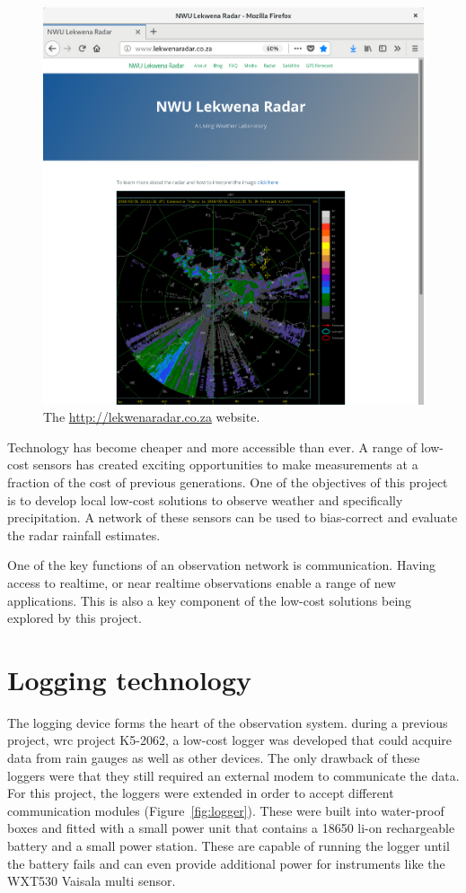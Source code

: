 \documentclass{wrcreport}
\begin{document}
\begin{figure}[!htp]
\includegraphics[width=\textwidth]{website1.png}
  \caption[The http://lekwenaradar.co.za website.]{The \url{http://lekwenaradar.co.za} website.}
 \label{fig:website}
\end{figure}

Technology has become cheaper and more accessible than ever. A range of low-cost sensors has created exciting opportunities to make measurements at a fraction of the cost of previous generations. One of the objectives of this project is to develop local low-cost solutions to observe weather and specifically precipitation. A network of these sensors can be used to bias-correct and evaluate the radar rainfall estimates.

One of the key functions of an observation network is communication. Having access to realtime, or near realtime observations enable a range of new applications. This is also a key component of the low-cost solutions being explored by this project.

\section{Logging technology}

The logging device forms the heart of the observation system. during a previous project, \gls{wrc} project K5-2062, a low-cost logger was developed that could acquire data from rain gauges as well as other devices. The only drawback of these loggers were that they still required an external modem to communicate the data. For this project, the loggers were extended in order to accept different communication modules (Figure~\ref{fig:logger}). These were built into water-proof boxes and fitted with a small power unit that contains a 18650 li-on rechargeable battery and a small power station. These are capable of running the logger until the battery fails and can even provide additional power for instruments like the WXT530 Vaisala multi sensor.
\end{document}

